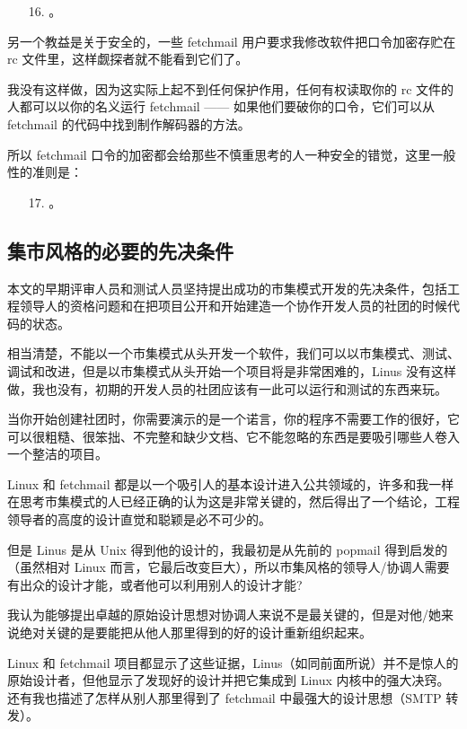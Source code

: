 \begin{enumerate}
\item[16.] 。
\end{enumerate}

另一个教益是关于安全的，一些 fetchmail 用户要求我修改软件把口令加密存贮在 rc 文件里，这样觑探者就不能看到它们了。


我没有这样做，因为这实际上起不到任何保护作用，任何有权读取你的 rc 文件的人都可以以你的名义运行 fetchmail —— 如果他们要破你的口令，它们可以从 fetchmail 的代码中找到制作解码器的方法。


所以 fetchmail 口令的加密都会给那些不慎重思考的人一种安全的错觉，这里一般性的准则是：

\begin{enumerate}
\item[17.] 。
\end{enumerate}

\subsection{集市风格的必要的先决条件}


本文的早期评审人员和测试人员坚持提出成功的市集模式开发的先决条件，包括工程领导人的资格问题和在把项目公开和开始建造一个协作开发人员的社团的时候代码的状态。


相当清楚，不能以一个市集模式从头开发一个软件，我们可以以市集模式、测试、调试和改进，但是以市集模式从头开始一个项目将是非常困难的，Linus 没有这样做，我也没有，初期的开发人员的社团应该有一此可以运行和测试的东西来玩。


当你开始创建社团时，你需要演示的是一个诺言，你的程序不需要工作的很好，它可以很粗糙、很笨拙、不完整和缺少文档、它不能忽略的东西是要吸引哪些人卷入一个整洁的项目。


Linux 和 fetchmail 都是以一个吸引人的基本设计进入公共领域的，许多和我一样在思考市集模式的人已经正确的认为这是非常关键的，然后得出了一个结论，工程领导者的高度的设计直觉和聪颖是必不可少的。


但是 Linus 是从 Unix 得到他的设计的，我最初是从先前的 popmail 得到启发的（虽然相对 Linux 而言，它最后改变巨大），所以市集风格的领导人/协调人需要有出众的设计才能，或者他可以利用别人的设计才能?


我认为能够提出卓越的原始设计思想对协调人来说不是最关键的，但是对他/她来说绝对关键的是要能把从他人那里得到的好的设计重新组织起来。


Linux 和 fetchmail 项目都显示了这些证据，Linus（如同前面所说）并不是惊人的原始设计者，但他显示了发现好的设计并把它集成到 Linux 内核中的强大决窍。还有我也描述了怎样从别人那里得到了 fetchmail 中最强大的设计思想（SMTP 转发）。


